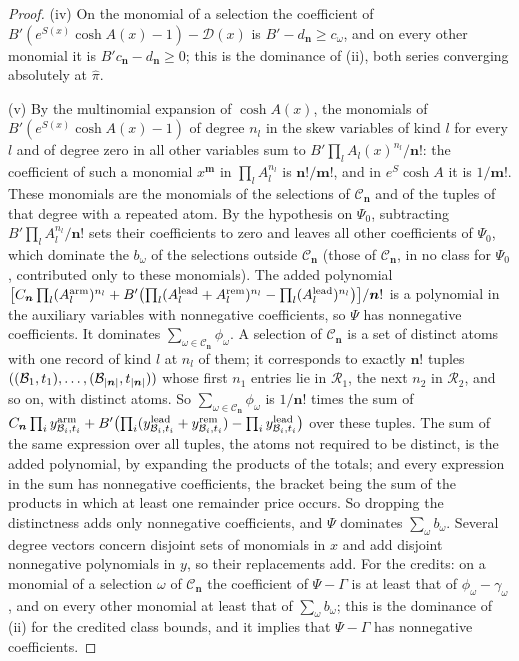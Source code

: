 \begin{proof}
(iv) On the monomial of a selection the coefficient of
$B'(e^{S(x)}\cosh A(x)-1)-\mathcal D(x)$ is $B'-d_{\boldsymbol n}\ge c_\omega$,
and on every other monomial it is $B'c_{\boldsymbol n}-d_{\boldsymbol n}\ge0$;
this is the dominance of (ii), both series converging absolutely at $\hat\pi$.

(v) By the multinomial expansion of $\cosh A(x)$, the monomials of
$B'(e^{S(x)}\cosh A(x)-1)$ of degree $n_l$ in the skew variables of kind $l$
for every $l$ and of degree zero in all other variables sum to
$B'\prod_lA_l(x)^{n_l}/\boldsymbol n!$: the coefficient of such a monomial
$x^{\boldsymbol m}$ in $\prod_lA_l^{n_l}$ is $\boldsymbol n!/\boldsymbol m!$,
and in $e^{S}\cosh A$ it is $1/\boldsymbol m!$. These monomials are the
monomials of the selections of $\mathcal C_{\boldsymbol n}$ and of the tuples
of that degree with a repeated atom. By the hypothesis on $\Psi_0$,
subtracting $B'\prod_lA_l^{n_l}/\boldsymbol n!$ sets their coefficients to
zero and leaves all other coefficients of $\Psi_0$, which dominate the
$b_\omega$ of the selections outside $\mathcal C_{\boldsymbol n}$ (those of
$\mathcal C_{\boldsymbol n}$, in no class for $\Psi_0$, contributed only to
these monomials). The added polynomial
$\bigl[C_{\boldsymbol n}\prod_l(A^{\rm arm}_l)^{n_l}+B'\bigl(\prod_l(A^{\rm
lead}_l+A^{\rm rem}_l)^{n_l}-\prod_l(A^{\rm lead}_l)^{n_l}\bigr)\bigr]/\boldsymbol
n!$ is a polynomial in the auxiliary variables with nonnegative coefficients,
so $\Psi$ has nonnegative coefficients. It dominates
$\sum_{\omega\in\mathcal C_{\boldsymbol n}}\phi_\omega$. A selection of
$\mathcal C_{\boldsymbol n}$ is a set of distinct atoms with one record of
kind $l$ at $n_l$ of them; it corresponds to exactly $\boldsymbol n!$ tuples
$((\mathcal B_1,t_1),\dots,(\mathcal B_{|\boldsymbol n|},t_{|\boldsymbol n|}))$ whose first
$n_1$ entries lie in $\mathcal R_1$, the next $n_2$ in $\mathcal R_2$, and so
on, with distinct atoms. So $\sum_{\omega\in\mathcal C_{\boldsymbol
n}}\phi_\omega$ is $1/\boldsymbol n!$ times the sum of
$C_{\boldsymbol n}\prod_iy^{\rm arm}_{\mathcal B_i,t_i}+B'\bigl(\prod_i(y^{\rm
lead}_{\mathcal B_i,t_i}+y^{\rm rem}_{\mathcal B_i,t_i})-\prod_iy^{\rm lead}_{\mathcal B_i,t_i}\bigr)$
over these tuples. The sum of the same expression over all tuples, the atoms
not required to be distinct, is the added polynomial, by expanding the
products of the totals; and every expression in the sum has nonnegative
coefficients, the bracket being the sum of the products in which at least
one remainder price occurs. So dropping the distinctness adds only
nonnegative coefficients, and $\Psi$ dominates $\sum_\omega b_\omega$. Several
degree vectors concern disjoint sets of monomials in $x$ and add disjoint
nonnegative polynomials in $y$, so their replacements add. For the credits:
on a monomial of a selection $\omega$ of
$\mathcal C_{\boldsymbol n}$ the coefficient of $\Psi-\Gamma$ is at least
that of $\phi_\omega-\gamma_\omega$, and on every other monomial at least that
of $\sum_\omega b_\omega$; this is the dominance of (ii) for the credited
class bounds, and it implies that $\Psi-\Gamma$ has nonnegative coefficients.
\end{proof}

